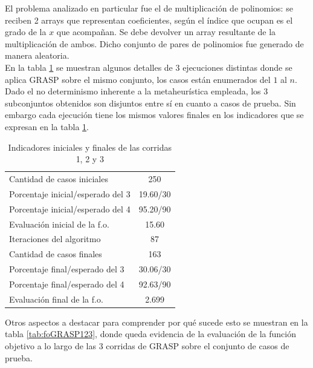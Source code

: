 \documentclass[a4paper,12pt]{book}
\begin{document}
	El problema analizado en particular fue el de multiplicación de polinomios: se reciben 2 arrays que representan coeficientes, según el índice que ocupan es el grado de la $x$ que acompañan. Se debe devolver un array resultante de la multiplicación de ambos. Dicho conjunto de pares de polinomios fue generado de manera aleatoria. \\
	
	En la tabla \ref{tab:IndicadoresGRASP123} se muestran algunos detalles de 3 ejecuciones distintas donde se aplica GRASP sobre el mismo conjunto, los casos están enumerados del $1$ al $n$. Dado el no determinismo inherente a la metaheurística empleada, los 3 subconjuntos obtenidos son disjuntos entre sí en cuanto a casos de prueba. Sin embargo cada ejecución tiene los mismos valores finales en los indicadores que se expresan en la tabla \ref{tab:IndicadoresGRASP123}.
	
	\begin{table}[h]
		\begin{center}
			\begin{tabular}{| l | c |} \hline
				Cantidad de casos iniciales & 250 \\
				Porcentaje inicial/esperado del 3 & 19.60/30 \\
				Porcentaje inicial/esperado del 4 & 95.20/90 \\
				Evaluación inicial de la f.o. & 15.60 \\ \hline
				Iteraciones del algoritmo & 87 \\ \hline
				Cantidad de casos finales & 163 \\
				Porcentaje final/esperado del 3 & 30.06/30 \\
				Porcentaje final/esperado del 4 & 92.63/90 \\
				Evaluación final de la f.o. & 2.699 \\ \hline
			\end{tabular}
			\caption{Indicadores iniciales y finales de las corridas 1, 2 y 3}
			\label{tab:IndicadoresGRASP123}
		\end{center}
	\end{table}

	Otros aspectos a destacar para comprender por qué sucede esto se muestran en la tabla \ref{tab:foGRASP123}, donde queda evidencia de la evaluación de la función objetivo a lo largo de las 3 corridas de GRASP sobre el conjunto de casos de prueba.
	
\end{document}
